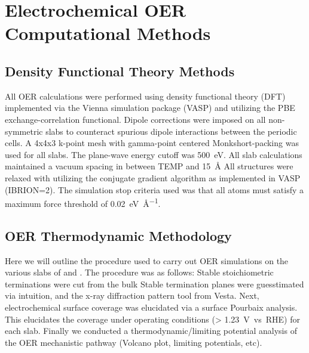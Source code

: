 

\section{Electrochemical OER Computational Methods}  %
%


\subsection{Density Functional Theory Methods}  %
%
%
All OER calculations were performed using density functional theory (DFT) implemented via the Vienna  simulation package (VASP)
\cite{Kresse1995,Kresse1996_0,Kresse1996_1}
and utilizing the PBE exchange-correlation functional\cite{Perdew1996}.
%
Dipole corrections were imposed on all non-symmetric slabs to counteract spurious dipole interactions between the periodic cells.\cite{Neugebauer1992}
%
A 4x4x3 k-point mesh with gamma-point centered Monkshort-packing\cite{Monkhorst1976} was used for all slabs.
%
The plane-wave energy cutoff was \SI{500}{\electronvolt}.
%
All slab calculations maintained a vacuum spacing in between TEMP and \SI{15}{\angstrom}
%
All structures were relaxed with utilizing the conjugate gradient algorithm as implemented in VASP (IBRION\num{=2}).
%
The simulation stop criteria used was that all atoms must satisfy a maximum force threshold of \SI{0.02}{\electronvolt\per\angstrom}.


\subsection{OER Thermodynamic Methodology}  %
%
%
Here we will outline the procedure used to carry out OER simulations on the various slabs of \IrOtwo and \IrOthree.
%
The procedure was as follows:
%
Stable stoichiometric terminations were cut from the bulk
%
Stable termination planes were guesstimated via intuition, and the x-ray diffraction pattern tool from Vesta.
%
Next, electrochemical surface coverage was elucidated via a surface Pourbaix analysis.
%
This elucidates the coverage under operating conditions (> \SI{1.23}{\volt vs. RHE}) for each slab.
%
Finally we conducted a thermodynamic/limiting potential analysis of the OER mechanistic pathway (Volcano plot, limiting potentials, etc).



